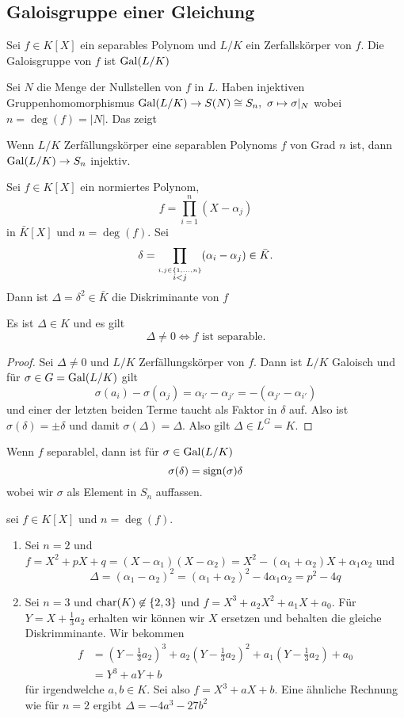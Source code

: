 \subsection{Galoisgruppe einer Gleichung}
\begin{Def}
    Sei $f\in K[X]$ ein separables Polynom und $L/K$ ein Zerfallskörper von $f$. Die Galoisgruppe von $f$ ist $\operatorname{Gal}(L/K)$
\end{Def}
\begin{Bem}
    Sei $N$ die Menge der Nullstellen von $f$ in $L$.
    Haben injektiven Gruppenhomomorphismus $\operatorname{Gal}(L/K)\to S(N)\cong S_n,\ \sigma\mapsto \sigma|_N$ wobei $n=\deg(f)=|N|$. Das zeigt
\end{Bem}
\begin{Satz}
    Wenn $L/K$ Zerfällungskörper eine separablen Polynoms $f$ von Grad $n$ ist, dann $\operatorname{Gal}(L/K)\to S_n$ injektiv.
\end{Satz}
\begin{Def}[Diskriminante]
    Sei $f\in K[X]$ ein normiertes Polynom, $$f=\prod_{i=1}^n(X-\alpha_j)$$ in $\bar K[X]$ und $n=\deg(f)$. Sei 
    $$\delta=\prod_{\stackrel{i,j\in\{1,\dots,n\} }{i<j}}(\alpha_i-\alpha_j)\in\bar K.$$
    Dann ist $\Delta=\delta^2\in\bar K$ die Diskriminante von $f$
\end{Def}
\begin{Lemma}
    Es ist $\Delta\in K$ und es gilt  $$\Delta\neq 0\iff f \text{ ist separable.}$$
\end{Lemma}
\begin{proof}
    Sei $\Delta\neq 0$ und $L/K$ Zerfällungskörper von $f$.
    Dann ist $L/K$ Galoisch und für $\sigma\in G=\operatorname{Gal}(L/K)$ gilt
    $$\sigma(a_i)-\sigma(\alpha_j)=\alpha_{i'}-\alpha_{j'}=-(\alpha_{j'}-\alpha_{i'})$$ 
    und einer der letzten beiden Terme taucht als Faktor in $\delta$ auf. Also ist $\sigma(\delta)=\pm \delta$ und damit $\sigma(\Delta)=\Delta$. Also gilt $\Delta\in L^G=K$.
\end{proof}
\begin{Bem}
    Wenn $f$ separablel, dann ist für $\sigma\in\operatorname{Gal}(L/K)$ $$\sigma(\delta)=\operatorname{sign}(\sigma)\delta$$ wobei wir $\sigma$ als Element in $S_n$ auffassen.
\end{Bem}
\begin{Bem}
    sei $f\in K[X]$ und $n=\deg(f)$.
    \begin{enumerate}
        \item Sei $n=2$ und $f=X^2+pX+q=(X-\alpha_1)(X-\alpha_2)=X^2-(\alpha_1+\alpha_2)X+\alpha_1\alpha_2$
        und $$\Delta=(\alpha_1-\alpha_2)^2=(\alpha_1+\alpha_2)^2-4\alpha_1\alpha_2=p^2-4q$$
        \item Sei $n=3$ und $\operatorname{char} (K)\not\in\{2,3\}$ und $f=X^3+a_2X^2+a_1X+a_0$. Für $Y=X+\frac{1}{3}a_2$ erhalten wir können wir $X$ ersetzen und behalten die gleiche Diskrimminante. Wir bekommen
        \begin{align*}
            f&=(Y-\frac{1}{3}a_2)^3+a_2(Y-\frac 13 a_2)^2+a_1(Y-\frac 1 3a_2)+a_0\\
            &=Y^3+aY+b
        \end{align*} für irgendwelche $a,b\in K$. Sei also $f=X^3+aX+b$. Eine ähnliche 
        Rechnung wie für $n=2$ ergibt $\Delta=-4a^3-27b^2$
    \end{enumerate}
\end{Bem}
